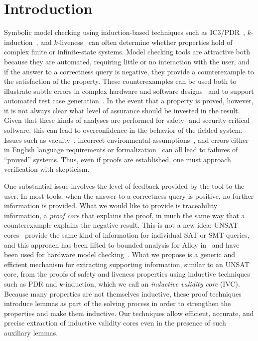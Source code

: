 \section{Introduction}
\label{sec:intro}

Symbolic model checking using induction-based techniques such as IC3/PDR~\cite{Een2011:PDR}, $k$-induction~\cite{SheeranSS00}, and $k$-liveness~\cite{conf/fmcad/ClaessenS12} can often determine whether properties hold of complex finite or infinite-state systems.    Model checking tools are attractive both because they are automated, requiring little or no interaction with the user, and if the answer to a correctness query is negative, they provide a counterexample to the satisfaction of the property.  These counterexamples can be used both to illustrate subtle errors in complex hardware and software designs~\cite{hilt2013,McMillan99:compositional, Miller10:CACM} and to support automated test case generation~\cite{Whalen13:OMCDC, You15:dse}.
In the event that a property is proved, however, it is not always clear what level of assurance should be invested in the result.  Given that these kinds of analyses are performed for safety- and security-critical software, this can lead to overconfidence in the behavior of the fielded system.  Issues such as vacuity~\cite{Kupferman03:Vacuity}, incorrect environmental assumptions~\cite{Whalen07:FMICS}, and errors either in English language requirements or formalization~\cite{Pike06:axioms} can all lead to failures of ``proved'' systems.  Thus, even if proofs are established, one must approach verification with skepticism.

One substantial issue involves the level of feedback provided by the tool to the user. In most tools, when the answer to a correctness query is positive, no further information is provided. What we would like to provide is traceability information, a {\em proof core} that explains the proof, in much the same way that a counterexample explains the
negative result. This is not a new idea: UNSAT cores~\cite{zhang2003extracting} provide the same kind of information for individual SAT or
SMT queries, and this approach has been lifted to bounded analysis
for Alloy in~\cite{Torlak08:cores} and have been used for hardware model checking~\cite{jasper_gold}. What we propose is a generic and efficient
mechanism for extracting supporting information, similar to an UNSAT
core, from the proofs of safety and liveness properties using inductive techniques
such as PDR and $k$-induction, which we call an {\em inductive validity core} (IVC). Because many properties are not themselves inductive, these proof techniques introduce lemmas as part of the solving process in order to strengthen the properties and make them inductive. Our techniques allow efficient, accurate, and precise extraction of inductive validity cores even in the presence of such auxiliary lemmas.

